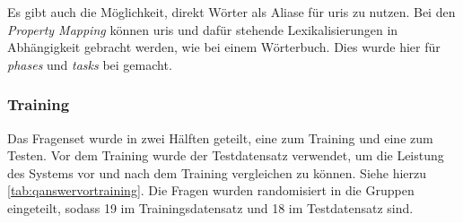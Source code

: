 Es gibt auch die Möglichkeit, direkt Wörter als Aliase für \acp{uri} zu nutzen.
Bei den \emph{Property Mapping} können \acp{uri} und dafür stehende Lexikalisierungen in Abhängigkeit gebracht werden, wie bei einem Wörterbuch.
Dies wurde hier für \emph{phases} und \emph{tasks} bei  gemacht.

\subsubsection{Training}

Das Fragenset wurde in zwei Hälften geteilt, eine zum Training und eine zum Testen.
Vor dem Training wurde der Testdatensatz verwendet, um die Leistung des Systems vor und nach dem Training vergleichen zu können.
Siehe hierzu \cref{tab:qanswervortraining}.
Die Fragen wurden randomisiert in die Gruppen eingeteilt, sodass 19 im Trainingsdatensatz und 18 im Testdatensatz sind.

